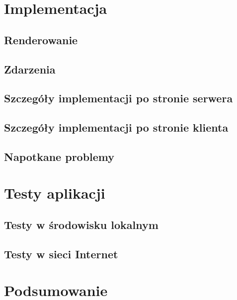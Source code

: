 \documentclass[polish]{inz}
\begin{document}
\chapter{Implementacja}
\section{Renderowanie}

\section{Zdarzenia}


\section{Szczegóły implementacji po stronie serwera}
\label{sec:implementation_server}


\section{Szczegóły implementacji po stronie klienta}


\section{Napotkane problemy}


\chapter{Testy aplikacji}


\section{Testy w środowisku lokalnym}


\section{Testy w sieci Internet}


\chapter{Podsumowanie}



\printindex
\end{document}

